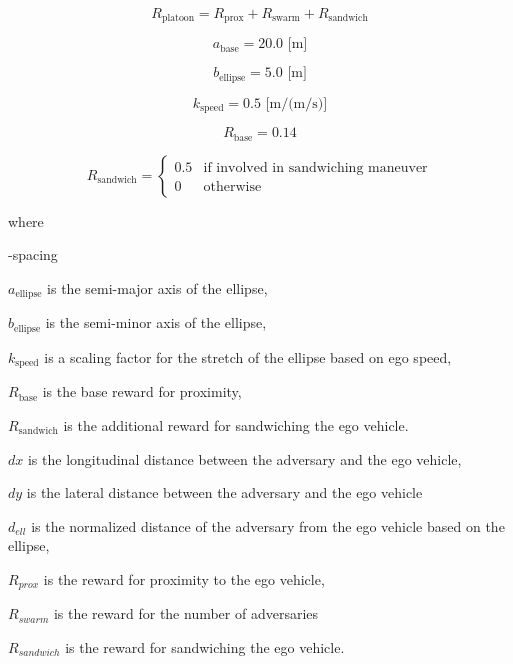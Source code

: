 \documentclass[12pt, a4paper]{report}
\begin{document}
\begin{equation}
    R_{\mathrm{platoon}} = R_{\mathrm{prox}} + R_{\mathrm{swarm}} + R_{\mathrm{sandwich}}
\end{equation}

\begin{equation}
    a_{\mathrm{base}} = 20.0 \text{ [m]}
\end{equation}

\begin{equation}
    b_{\mathrm{ellipse}} = 5.0 \text{ [m]}
\end{equation}

\begin{equation}
    k_{\mathrm{speed}} = 0.5 \text{ [m/(m/s)]}
\end{equation}

\begin{equation}
    R_{\mathrm{base}} = 0.14
\end{equation}

\begin{equation}
    R_{\mathrm{sandwich}} = \begin{cases}
        0.5 & \text{if involved in sandwiching maneuver} \\
        0 & \text{otherwise}
    \end{cases}
\end{equation}

where 
\begin{list}{-}{spacing}
    \item \(a_{\mathrm{ellipse}}\) is the semi-major axis of the ellipse, 
    \item \(b_{\mathrm{ellipse}}\) is the semi-minor axis of the ellipse, 
    \item \(k_{\mathrm{speed}}\) is a scaling factor for the stretch of the ellipse based on ego speed,
    \item \(R_{\mathrm{base}}\) is the base reward for proximity,
    \item \(R_{\mathrm{sandwich}}\) is the additional reward for sandwiching the ego vehicle.
    \item \(dx\) is the longitudinal distance between the adversary and the ego vehicle,
    \item \(dy\) is the lateral distance between the adversary and the ego vehicle
    \item \(d_{ell}\) is the normalized distance of the adversary from the ego vehicle based on the ellipse,
    \item \(R_{prox}\) is the reward for proximity to the ego vehicle,
    \item \(R_{swarm}\) is the reward for the number of adversaries
    \item \(R_{sandwich}\) is the reward for sandwiching the ego vehicle.
\end{list}
\end{document}
